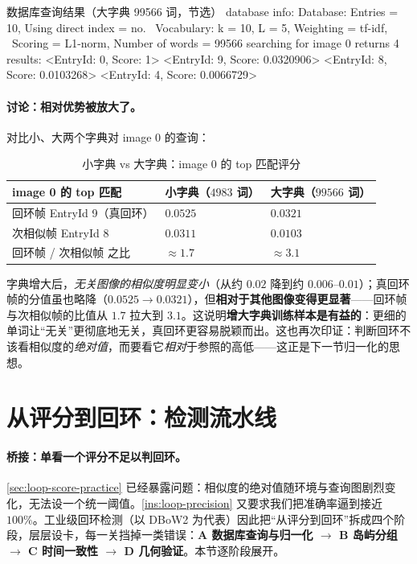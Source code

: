\begin{codebox}[text]{数据库查询结果（大字典 99566 词，节选）}
database info: Database: Entries = 10, Using direct index = no. \
Vocabulary: k = 10, L = 5, Weighting = tf-idf, \
Scoring = L1-norm, Number of words = 99566
searching for image 0 returns 4 results:
<EntryId: 0, Score: 1>
<EntryId: 9, Score: 0.0320906>
<EntryId: 8, Score: 0.0103268>
<EntryId: 4, Score: 0.0066729>
\end{codebox}

\paragraph{讨论：相对优势被放大了。}
对比小、大两个字典对 image 0 的查询：

\begin{table}[H]\centering\small
\caption{小字典 vs 大字典：image 0 的 top 匹配评分}
\label{tab:loop-bigdict}
\begin{tabular}{lll}
\toprule
image 0 的 top 匹配 & 小字典（$4983$ 词）& 大字典（$99566$ 词）\\
\midrule
回环帧 EntryId 9（真回环）& $0.0525$ & $0.0321$ \\
次相似帧 EntryId 8 & $0.0311$ & $0.0103$ \\
回环帧 / 次相似帧 之比 & $\approx 1.7$ & $\approx 3.1$ \\
\bottomrule
\end{tabular}
\end{table}

\noindent 字典增大后，\emph{无关图像的相似度明显变小}（从约 $0.02$ 降到约 $0.006$--$0.01$）；真回环帧的分值虽也略降（$0.0525\to0.0321$），但\textbf{相对于其他图像变得更显著}——回环帧与次相似帧的比值从 $1.7$ 拉大到 $3.1$\cite{gaoxiang2019slam14}。这说明\textbf{增大字典训练样本是有益的}：更细的单词让“无关”更彻底地无关，真回环更容易脱颖而出。这也再次印证：判断回环不该看相似度的\emph{绝对值}，而要看它\emph{相对}于参照的高低——这正是下一节归一化的思想。

\section{从评分到回环：检测流水线}
\label{sec:loop-pipeline}

\paragraph{桥接：单看一个评分不足以判回环。}
\cref{sec:loop-score-practice} 已经暴露问题：相似度的绝对值随环境与查询图剧烈变化，无法设一个统一阈值。\cref{ins:loop-precision} 又要求我们把准确率逼到接近 $100\%$。工业级回环检测（以 DBoW2\cite{galvez2012bags} 为代表）因此把“从评分到回环”拆成四个阶段，层层设卡，每一关挡掉一类错误：\textbf{A 数据库查询与归一化 $\to$ B 岛屿分组 $\to$ C 时间一致性 $\to$ D 几何验证}。本节逐阶段展开。

